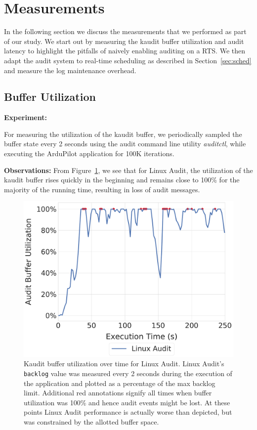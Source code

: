 \section{Measurements}
\label{sec:measurement}
In the following section we discuss the measurements that we performed as part of our study. We start out by measuring the kaudit buffer utilization and audit latency to highlight the pitfalls of naively enabling auditing on a RTS. We then adapt the audit system to real-time scheduling as described in Section~\ref{sec:sched} and measure the log maintenance overhead.

\subsection{Buffer Utilization}

\textbf{Experiment:}

 For measuring the utilization of the kaudit buffer, we periodically sampled the buffer state every 2 seconds using the audit command line utility \textit{auditctl}, while executing the ArduPilot application for 100K iterations. 

\textbf{Observations:} From Figure~\ref{fig:eval_backlog}, we see that for Linux Audit, the utilization of the kaudit buffer rises quickly in the beginning and remains close to 100\% for the majority of the running time, resulting in loss of audit messages.

\begin{figure}[t!]
    \centering
    \includegraphics[width=0.9\linewidth,keepaspectratio,scale=0.9]{fig/backlog_over_time_hlight.pdf}
    \caption{\label{fig:eval_backlog}Kaudit buffer utilization over time for Linux Audit. Linux Audit's {\tt backlog} value was measured every 2 seconds during the execution of the application and plotted as a percentage of the max backlog limit.
    Additional red annotations signify all times when buffer utilization was 100\% and hence audit events might be lost. At these points Linux Audit performance is actually worse than depicted, but was constrained by the allotted buffer space.}    
\end{figure} 


